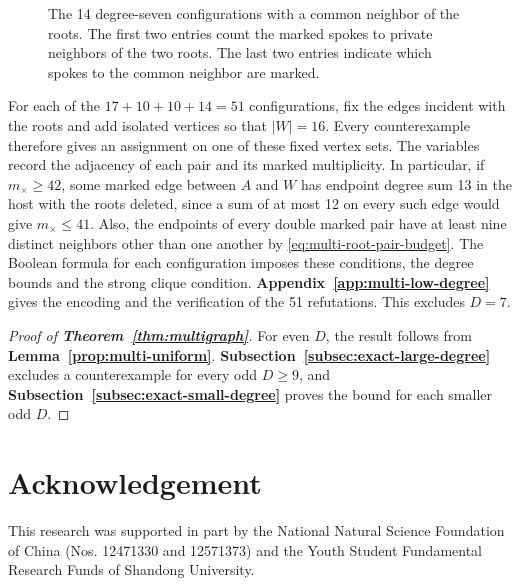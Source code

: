 \documentclass[preprint,11pt,numbers]{elsarticle-arxiv}
\makeatletter
\newcommand{\FloatBarrier}{\par\ifx\@deferlist\@empty\else\clearpage\fi}}
\numberwithin{equation}{section}
\theoremstyle{definition}
\newenvironment{lateproof}[1]{\begin{proof}[Proof of #1]}{\end{proof}}
\makeatother
\begin{document}
\begin{figure}[htbp]
\caption{The 14 degree-seven configurations with a common neighbor of the roots. The first two entries count the marked spokes to private neighbors of the two roots. The last two entries indicate which spokes to the common neighbor are marked.}
\label{fig:finite-seven-shared}
\end{figure}
\FloatBarrier

For each of the $17+10+10+14=51$ configurations, fix the
edges incident with the roots and add isolated vertices so that $|W|=16$.
Every counterexample therefore gives an assignment on one of these
fixed vertex sets. The variables record the adjacency of each pair
and its marked multiplicity. In particular, if $m_\times\geq42$,
some marked edge between $A$ and $W$ has endpoint degree sum 13
in the host with the roots deleted, since a sum of at most 12 on
every such edge would give $m_\times\leq41$. Also, the endpoints
of every double marked pair have at least nine distinct neighbors
other than one another by \eqref{eq:multi-root-pair-budget}.
The Boolean formula for each configuration imposes these conditions,
the degree bounds and the strong clique condition.
\textbf{Appendix~\ref{app:multi-low-degree}} gives the encoding and
the verification of the 51 refutations. This excludes $D=7$.

\begin{lateproof}{\textbf{Theorem~\ref{thm:multigraph}}}
For even $D$, the result follows from \textbf{Lemma~\ref{prop:multi-uniform}}.
\textbf{Subsection~\ref{subsec:exact-large-degree}} excludes a
counterexample for every odd $D\geq9$, and
\textbf{Subsection~\ref{subsec:exact-small-degree}} proves the bound
for each smaller odd $D$.
\end{lateproof}
\section*{Acknowledgement}
This research was supported in part by the National Natural Science Foundation
of China (Nos. 12471330 and 12571373) and the Youth Student Fundamental Research
Funds of Shandong University.
\end{document}
